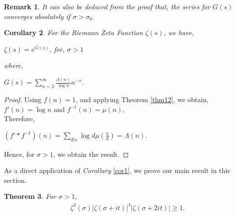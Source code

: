 \documentclass[article,12pt]{elsarticle}
\newtheorem{thm}{Theorem}[section]
\newtheorem{cor}[thm]{Corollary}
\newtheorem{rmk}[thm]{Remark}
\begin{document}
	\begin{rmk}
		It can also be deduced from the proof that, the series for $G(s)$ converges absolutely if $\sigma>\sigma_{0}$.
	\end{rmk}
	\begin{cor}\label{cor1}
		For the Riemann Zeta Function $\zeta(s)$, we have,
		\begin{center}
			$\zeta(s)=e^{G(s)}$, \hspace{20pt} for, \hspace{10pt}$\sigma>1$ 
		\end{center}
		where, 
		\begin{center}
			$G(s)=\sum\limits_{n=2}^{\infty}\frac{\Lambda(n)}{\log n }n^{-s}$.
		\end{center}
	\end{cor}
	\begin{proof}
		Using $f(n)=1$, and applying Theorem \eqref{thm12}, we obtain, $f'(n)=\log n$ and $f^{-1}(n)=\mu(n)$,\\
		Therefore,
		\begin{center}
			$(f'*f^{-1})(n)=\sum\limits_{d|n}\log d\mu(\frac{n}{d})=\Lambda (n)$.
		\end{center}
		Hence, for $\sigma >1$, we obtain the result.
	\end{proof}	
	As a direct application of \textit{Corollary} \eqref{cor1}, we prove our main result in this section.	
	\begin{thm}\label{thm13}
		For $\sigma>1$, 
		\begin{eqnarray}\label{20}
			\zeta^{3}(\sigma)|\zeta(\sigma+it)|^{4}|\zeta(\sigma+2it)|\geq 1.
		\end{eqnarray}
	\end{thm}
\end{document}
